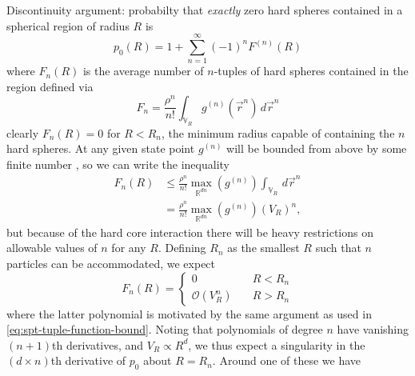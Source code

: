 \documentclass[11pt]{report}
\begin{document}
Discontinuity argument: probabilty that \emph{exactly} zero hard spheres contained in a spherical region of radius $R$ is \cite{Mandell1976}
\begin{equation}
  p_0(R) = 1 + \sum_{n=1}^{\infty} (-1)^n F^{(n)}(R)
\end{equation}
where $F_n(R)$ is the average number of $n$-tuples of hard spheres contained in the region defined via
\begin{equation}\label{eq:spt-tuple-function}
  F_n = \frac{\rho^n}{n!} \int_{\mathbb{V}_R} g^{(n)}(\vec{r}^n) \, d\vec{r}^n
\end{equation}
clearly $F_n(R) = 0$ for $R < R_n$, the minimum radius capable of containing the $n$ hard spheres.
At any given state point $g^{(n)}$ will be bounded from above by some finite number%
,
so we can write the inequality
\begin{equation}\label{eq:spt-tuple-function-bound}
  \begin{split}
    F_n(R) &\le
    \frac{\rho^n}{n!}
    \max_{\mathbb{R}^{dn}}{\left(g^{(n)}\right)}
    \int_{\mathbb{V}_R} \, d\vec{r}^n \\
    &=
    \frac{\rho^n}{n!}
    \max_{\mathbb{R}^{dn}}{\left(g^{(n)}\right)}
    (V_R)^n,
  \end{split}
\end{equation}
but because of the hard core interaction there will be heavy restrictions on allowable values of $n$ for any $R$.
Defining $R_n$ as the smallest $R$ such that $n$ particles can be accommodated, we expect
\begin{equation}
  F_n(R) =
  \begin{cases}
    0 & \quad R < R_n \\
    \mathcal{O}\left( V_R^n \right) & \quad R > R_n
  \end{cases}
\end{equation}
where the latter polynomial is motivated by the same argument as used in \eqref{eq:spt-tuple-function-bound}.
Noting that polynomials of degree $n$ have vanishing $(n+1)$th derivatives, and $V_R \propto R^d$, we thus expect a singularity in the $(d \times n)$th derivative of $p_0$ about $R=R_n$.
Around one of these we have 
\end{document}
